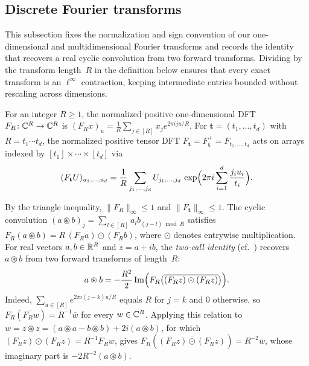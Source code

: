 \subsection{Discrete Fourier transforms}\label{sec:prelim-dft}\label{sec:prelim-oai-transform}

This subsection fixes the normalization and sign convention of our one-dimensional and multidimensional Fourier transforms and records the identity that recovers a real cyclic convolution from two forward transforms. Dividing by the transform length~$R$ in the definition below ensures that every exact transform is an $\ell^\infty$ contraction, keeping intermediate entries bounded without rescaling across dimensions.

\begin{definition}\label{def:dft}
For an integer $R\ge 1$, the normalized positive one-dimensional DFT $F_R\colon\mathbb{C}^R\to\mathbb{C}^R$ is
$(F_R x)_u=\frac1R\sum_{j\in[R]}x_j e^{2\pi iju/R}$. For $\mathbf t=(t_1,\dots,t_d)$ with $R=t_1\cdots t_d$, the
normalized positive tensor DFT $F_{\mathbf t}=F^+_{\mathbf t}=F_{t_1,\dots,t_d}$ acts on arrays indexed by
$[t_1]\times\cdots\times[t_d]$ via
\[
  (F_{\mathbf t}U)_{u_1,\dots,u_d}=\frac1R\sum_{j_1,\dots,j_d}U_{j_1,\dots,j_d}\,
  \exp\Bigl(2\pi i\sum_{i=1}^d\frac{j_i u_i}{t_i}\Bigr).
\]
\end{definition}

By the triangle inequality, $\|F_R\|_\infty\le 1$ and $\|F_{\mathbf t}\|_\infty\le 1$. The cyclic convolution $(a\circledast b)_j=\sum_{l\in[R]}a_l b_{(j-l)\bmod R}$ satisfies $F_R(a\circledast b)=R\,(F_R a)\odot(F_R b)$, where $\odot$ denotes entrywise multiplication. For real vectors $a,b\in\mathbb{R}^R$ and $z=a+ib$, the \emph{two-call identity} (cf.~\cite{MS}) recovers $a\circledast b$ from two forward transforms of length~$R$:
\begin{equation}\label{eq:two-call}
  a\circledast b=-\frac{R^2}{2}\,\mathrm{Im}\Bigl(F_R\bigl(\overline{(F_R z)\odot(F_R z)}\bigr)\Bigr).
\end{equation}
Indeed, $\sum_{u\in[R]}e^{2\pi i(j-k)u/R}$ equals $R$ for $j=k$ and $0$ otherwise, so $F_R(\overline{F_R w})=R^{-1}\overline w$ for every $w\in\mathbb{C}^R$. Applying this relation to $w=z\circledast z=(a\circledast a-b\circledast b)+2i(a\circledast b)$, for which $(F_R z)\odot(F_R z)=R^{-1}F_R w$, gives $F_R(\overline{(F_R z)\odot(F_R z)})=R^{-2}\overline w$, whose imaginary part is $-2R^{-2}(a\circledast b)$.

